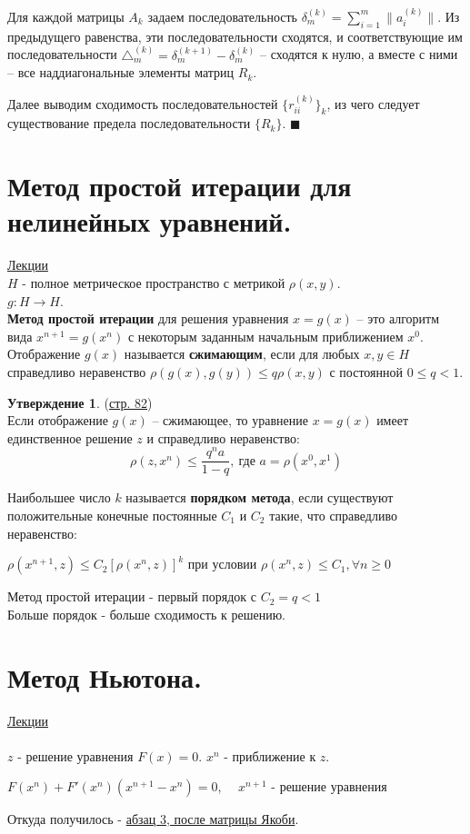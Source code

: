 \documentclass[specialist, subf, href, colorlinks=true, 12pt, times, mtpro, final]{disser}
\theoremstyle{definition}
\newtheorem{state}{Утверждение}[section]
\begin{document}
{Для каждой матрицы $A_k$ задаем последовательность $\delta^{(k)}_m = \sum\limits^m_{i=1} \|a^{(k)}_i\|$. Из предыдущего равенства, эти последовательности сходятся, и соответствующие им последовательности $\triangle^{(k)}_m = \delta^{(k+1)}_m - \delta^{(k)}_m$ \--- сходятся к нулю, а вместе с ними \--- все наддиагональные элементы матриц $R_k$.

Далее выводим сходимость последовательностей $\{r^{(k)}_{ii}\}_k$, из чего следует существование предела последовательности $\{R_k\}$. $\blacksquare$



\section {Метод простой итерации для нелинейных уравнений.}
    \hyperlink {lects.82}{Лекции}\\
$H$  - полное метрическое пространство с метрикой $\rho(x,y)$.\\
$g:H \rightarrow H$.\\
\textbf{Метод простой итерации} для решения уравнения $x = g(x)$ \--- это алгоритм вида $x^{n+1} = g(x^n)$ с некоторым заданным начальным приближением $x^0$.\\
Отображение $g(x)$ называется \textbf{сжимающим}, если для любых $x, y \in H$ справедливо неравенство $\rho(g(x), g(y)) \leq q\rho(x,y)$ с постоянной $0 \leq q < 1$.
\begin{state} (\hyperlink {lects.82}{стр. 82})\\
Если отображение $g(x)$ \--- сжимающее, то уравнение $x=g(x)$  имеет единственное решение $z$ и справедливо неравенство:
$$
\rho (z, x^n) \leq \frac{q^na}{1-q},\  \text{где } a = \rho (x^0, x^1)
$$
\end{state}

Наибольшее число $k$ называется \textbf{порядком метода}, если существуют положительные конечные постоянные $C_1$ и $C_2$ такие, что справедливо неравенство:
\begin{center}
$\rho(x^{n+1}, z) \leq C_2 [\rho(x^n,z)]^k$ 
при условии
 $ \rho (x^n,z) \leq C_1, \forall n \geq 0$
\end{center}

Метод простой итерации - первый порядок с $C_2 = q < 1$\\
Больше порядок - больше сходимость к решению.
    

\section {Метод Ньютона.}
    \hyperlink {lects.83}{Лекции}\\
\\
$z$ - решение уравнения $F(x) = 0$. $x^n$ - приближение к $z$.
\begin{center}
$F(x^n) + F'(x^n)(x^{n+1} - x^n) = 0$, \ \ $x^{n+1}$ - решение уравнения
\end{center}
Откуда получилось - \hyperlink {lects.83}{абзац 3, после матрицы Якоби}.

}
\end{document}
